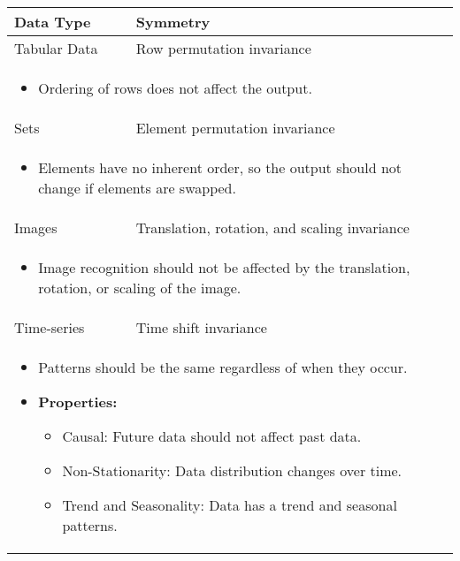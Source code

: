 \begin{summary}
    \begin{center}
        \begin{tabular}{ll}
            \toprule
            \textbf{Data Type} & \textbf{Symmetry} \\
            \toprule
            Tabular Data & Row permutation invariance \\
            \multicolumn{2}{p{\linewidth}}{
            \begin{itemize}
                \item Ordering of rows does not affect the output.
            \end{itemize}} \\
            \midrule
            Sets & Element permutation invariance \\ 
            \multicolumn{2}{p{\linewidth}}{
            \begin{itemize}
                \item Elements have no inherent order, so the output should not change if elements are swapped.
            \end{itemize}} \\
            \midrule
            Images & Translation, rotation, and scaling invariance \\
            \multicolumn{2}{p{\linewidth}}{
            \begin{itemize}
                \item Image recognition should not be affected by the translation, rotation, or scaling of the image.
            \end{itemize}} \\
            \midrule
            Time-series & Time shift invariance \\
            \multicolumn{2}{p{\linewidth}}{
            \begin{itemize}
                \item Patterns should be the same regardless of when they occur.
                \item \textbf{Properties:}
                \begin{itemize}
                    \item Causal: Future data should not affect past data.
                    \item Non-Stationarity: Data distribution changes over time.
                    \item Trend and Seasonality: Data has a trend and seasonal patterns.
                \end{itemize}

\end{itemize}}
\end{tabular}
\end{center}
\end{summary}
